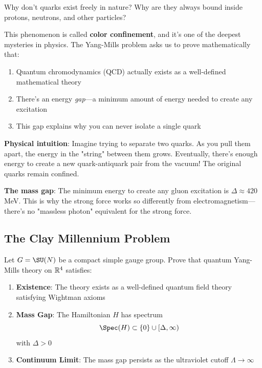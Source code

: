 \begin{intuitive}
Why don't quarks exist freely in nature? Why are they always bound inside protons, neutrons, and other particles?

This phenomenon is called \textbf{color confinement}, and it's one of the deepest mysteries in physics. The Yang-Mills problem asks us to prove mathematically that:
\begin{enumerate}
\item Quantum chromodynamics (QCD) actually exists as a well-defined mathematical theory
\item There's an energy \textit{gap}—a minimum amount of energy needed to create any excitation
\item This gap explains why you can never isolate a single quark
\end{enumerate}

\textbf{Physical intuition}: Imagine trying to separate two quarks. As you pull them apart, the energy in the "string" between them grows. Eventually, there's enough energy to create a new quark-antiquark pair from the vacuum! The original quarks remain confined.

\textbf{The mass gap}: The minimum energy to create any gluon excitation is $\Delta \approx 420$ MeV. This is why the strong force works so differently from electromagnetism—there's no "massless photon" equivalent for the strong force.
\end{intuitive}

\subsection{The Clay Millennium Problem}

\begin{defn}\label{def:ym-problem}
Let $G = \SU(N)$ be a compact simple gauge group. Prove that quantum Yang-Mills theory on $\mathbb{R}^4$ satisfies:

\begin{enumerate}
\item \textbf{Existence}: The theory exists as a well-defined quantum field theory satisfying Wightman axioms\cite{wightman1956quantum}
\item \textbf{Mass Gap}: The Hamiltonian $H$ has spectrum
\begin{equation}
\Spec(H) \subset \{0\} \cup [\Delta, \infty)
\end{equation}
with $\Delta > 0$
\item \textbf{Continuum Limit}: The mass gap persists as the ultraviolet cutoff $\Lambda \to \infty$
\end{enumerate}
\end{defn}

